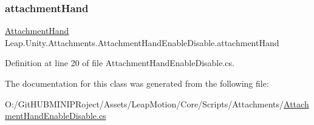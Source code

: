 \subsubsection{\texorpdfstring{attachmentHand}{attachmentHand}}
{\footnotesize\ttfamily \mbox{\hyperlink{class_leap_1_1_unity_1_1_attachments_1_1_attachment_hand}{Attachment\+Hand}} Leap.\+Unity.\+Attachments.\+Attachment\+Hand\+Enable\+Disable.\+attachment\+Hand}



Definition at line 20 of file Attachment\+Hand\+Enable\+Disable.\+cs.



The documentation for this class was generated from the following file\+:\begin{DoxyCompactItemize}
\item 
O\+:/\+Git\+H\+U\+B\+M\+I\+N\+I\+P\+Roject/\+Assets/\+Leap\+Motion/\+Core/\+Scripts/\+Attachments/\mbox{\hyperlink{_attachment_hand_enable_disable_8cs}{Attachment\+Hand\+Enable\+Disable.\+cs}}\end{DoxyCompactItemize}
